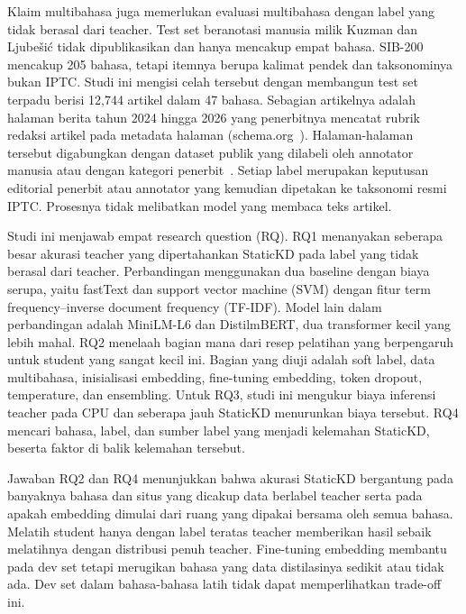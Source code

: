 \documentclass[journal]{IEEEtran}
\begin{document}
Klaim multibahasa juga memerlukan evaluasi multibahasa dengan label yang tidak berasal dari teacher. Test set beranotasi manusia milik Kuzman dan Ljube\v{s}i\'c tidak dipublikasikan dan hanya mencakup empat bahasa. SIB-200~\cite{adelani2024sib200} mencakup 205 bahasa, tetapi itemnya berupa kalimat pendek dan taksonominya bukan IPTC. Studi ini mengisi celah tersebut dengan membangun test set terpadu berisi 12,744 artikel dalam 47 bahasa. Sebagian artikelnya adalah halaman berita tahun 2024 hingga 2026 yang penerbitnya mencatat rubrik redaksi artikel pada metadata halaman (schema.org~\cite{guha2016schema}). Halaman-halaman tersebut digabungkan dengan dataset publik yang dilabeli oleh annotator manusia atau dengan kategori penerbit~\cite{adelani2023masakhanews,petukhova2023mnds,mirashi2023indicnews,hossain2025banglanews}. Setiap label merupakan keputusan editorial penerbit atau annotator yang kemudian dipetakan ke taksonomi resmi IPTC. Prosesnya tidak melibatkan model yang membaca teks artikel.

Studi ini menjawab empat research question (RQ). RQ1 menanyakan seberapa besar akurasi teacher yang dipertahankan StaticKD pada label yang tidak berasal dari teacher. Perbandingan menggunakan dua baseline dengan biaya serupa, yaitu fastText dan support vector machine (SVM) dengan fitur term frequency--inverse document frequency (TF-IDF). Model lain dalam perbandingan adalah MiniLM-L6 dan DistilmBERT, dua transformer kecil yang lebih mahal. RQ2 menelaah bagian mana dari resep pelatihan yang berpengaruh untuk student yang sangat kecil ini. Bagian yang diuji adalah soft label, data multibahasa, inisialisasi embedding, fine-tuning embedding, token dropout, temperature, dan ensembling. Untuk RQ3, studi ini mengukur biaya inferensi teacher pada CPU dan seberapa jauh StaticKD menurunkan biaya tersebut. RQ4 mencari bahasa, label, dan sumber label yang menjadi kelemahan StaticKD, beserta faktor di balik kelemahan tersebut.

Jawaban RQ2 dan RQ4 menunjukkan bahwa akurasi StaticKD bergantung pada banyaknya bahasa dan situs yang dicakup data berlabel teacher serta pada apakah embedding dimulai dari ruang yang dipakai bersama oleh semua bahasa. Melatih student hanya dengan label teratas teacher memberikan hasil sebaik melatihnya dengan distribusi penuh teacher. Fine-tuning embedding membantu pada dev set tetapi merugikan bahasa yang data distilasinya sedikit atau tidak ada. Dev set dalam bahasa-bahasa latih tidak dapat memperlihatkan trade-off ini.
\end{document}
